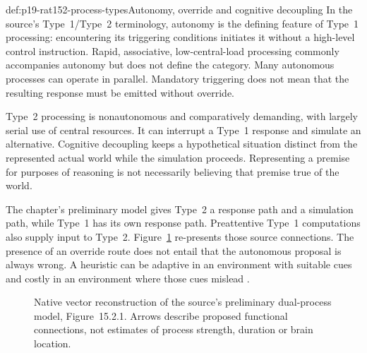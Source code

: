 \begin{hbdefinition}{def:p19-rat152-process-types}{Autonomy, override and cognitive decoupling}
In the source's Type~1/Type~2 terminology, autonomy is the defining feature
of Type~1 processing: encountering its triggering conditions initiates it
without a high-level control instruction. Rapid, associative, low-central-load
processing commonly accompanies autonomy but does not define the category.
Many autonomous processes can operate in parallel. Mandatory triggering
does not mean that the resulting response must be emitted without override.

Type~2 processing is nonautonomous and comparatively demanding, with largely
serial use of central resources. It can interrupt a Type~1 response and
simulate an alternative. Cognitive decoupling keeps a hypothetical situation
distinct from the represented actual world while the simulation proceeds.
Representing a premise for purposes of reasoning is not necessarily believing
that premise true of the world.
\end{hbdefinition}

The chapter's preliminary model gives Type~2 a response path and a simulation
path, while Type~1 has its own response path. Preattentive Type~1 computations
also supply input to Type~2. Figure~\ref{fig:p19-rat152-preliminary}
re-presents those source connections. The presence of an override route
does not entail that the autonomous proposal is always wrong. A heuristic
can be adaptive in an environment with suitable cues and costly in an
environment where those cues mislead
\cite[sec.~3, pp.~792--794, fig.~15.2.1]{StanovichToplakWest2021Intelligence}.

\begin{figure}[htbp]
\centering
{}
\caption{Native vector reconstruction of the source's preliminary
dual-process model, Figure~15.2.1. Arrows describe proposed functional
connections, not estimates of process strength, duration or brain location.}
\label{fig:p19-rat152-preliminary}
\end{figure}

